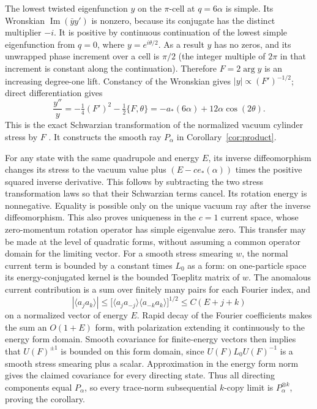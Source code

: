 \documentclass[11pt]{article}
\begin{document}
The lowest twisted eigenfunction \(y\) on the \(\pi\)-cell at \(q=6\alpha\) is simple. Its Wronskian \(\operatorname{Im}(\bar y y')\) is nonzero, because its conjugate has the distinct multiplier \(-i\). It is positive by continuous continuation of the lowest simple eigenfunction from \(q=0\), where \(y=e^{i\theta/2}\). As a result \(y\) has no zeros, and its unwrapped phase increment over a cell is \(\pi/2\) (the integer multiple of \(2\pi\) in that increment is constant along the continuation). Therefore \(F=2\arg y\) is an increasing degree-one lift. Constancy of the Wronskian gives \(|y|\propto(F')^{-1/2}\); direct differentiation gives
\[
 \frac{y''}{y}
 =-\tfrac14(F')^2-\tfrac12\{F,\theta\}
 =-a_*(6\alpha)+12\alpha\cos(2\theta).
\]
This is the exact Schwarzian transformation of the normalized vacuum cylinder stress by \(F\) \cite{fewster}. It constructs the smooth ray \(P_\alpha\) in Corollary~\ref{cor:product}.

For any state with the same quadrupole and energy \(E\), its inverse diffeomorphism changes its stress to the vacuum value plus \((E-c e_*(\alpha))\) times the positive squared inverse derivative. This follows by subtracting the two stress transformation laws so that their Schwarzian terms cancel. Its rotation energy is nonnegative. Equality is possible only on the unique vacuum ray after the inverse diffeomorphism. This also proves uniqueness in the \(c=1\) current space, whose zero-momentum rotation operator has simple eigenvalue zero. This transfer may be made at the level of quadratic forms, without assuming a common operator domain for the limiting vector. For a smooth stress smearing \(w\), the normal current term is bounded by a constant times \(L_0\) as a form: on one-particle space its energy-conjugated kernel is the bounded Toeplitz matrix of \(w\). The anomalous current contribution is a sum over finitely many pairs for each Fourier index, and
\[
 |\langle a_j a_k\rangle|
 \le \big[\langle a_j a_{-j}\rangle\langle a_{-k}a_k\rangle\big]^{1/2}
 \le C(E+j+k)
\]
on a normalized vector of energy \(E\). Rapid decay of the Fourier coefficients makes the sum an \(O(1+E)\) form, with polarization extending it continuously to the energy form domain. Smooth covariance for finite-energy vectors then implies that \(U(F)^{\pm1}\) is bounded on this form domain, since \(U(F)L_0U(F)^{-1}\) is a smooth stress smearing plus a scalar. Approximation in the energy form norm gives the claimed covariance for every directing state. Thus all directing components equal \(P_\alpha\), so every trace-norm subsequential \(k\)-copy limit is \(P_\alpha^{\otimes k}\), proving the corollary.
\end{document}
